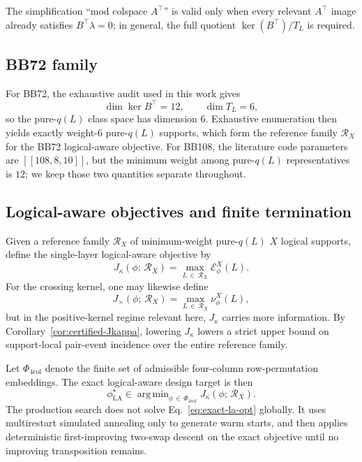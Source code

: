 \documentclass[
aps,
prx,
10pt,
twocolumn,
groupedaddress,
longbibliography,
nofootinbib,
floatfix
]{revtex4-2}
\theoremstyle{definition}
\DeclareMathOperator{\kerop}{ker}
\DeclareMathOperator*{\argmin}{arg\,min}
\newcommand{\Ew}{\mathcal{E}}
\newcommand{\RX}{\mathcal{R}_X}
\newcommand{\TL}{T_L}
\newcommand{\bb}[1]{\ensuremath{\left[\!\left[#1\right]\!\right]}}
\begin{document}
The simplification ``mod colspace $A^\top$'' is valid only when every relevant $A^\top$ image already satisfies $B^\top\lambda=0$; in general, the full quotient $\kerop(B^\top)/\TL$ is required.

\subsection{BB72 family}

For BB72, the exhaustive audit used in this work gives
\begin{equation}
\dim \kerop B^\top=12,
\qquad
\dim \TL=6,
\end{equation}
so the pure-$q(L)$ class space has dimension $6$. Exhaustive enumeration then yields exactly \bbSeventyTwoPureLFamilyCount{} weight-$6$ pure-$q(L)$ supports, which form the reference family $\RX$ for the BB72 logical-aware objective. For BB108, the literature code parameters are \bb{108,8,10}, but the minimum weight among pure-$q(L)$ representatives is $12$; we keep those two quantities separate throughout.

\subsection{Logical-aware objectives and finite termination}

Given a reference family $\RX$ of minimum-weight pure-$q(L)$ $X$ logical supports, define the single-layer logical-aware objective by
\begin{equation}
J_{\kappa}(\phi;\,\RX)=\max_{L\,\in\,\RX}\Ew_{\phi}^{X}(L).
\label{eq:Jkappa}
\end{equation}
For the crossing kernel, one may likewise define
\begin{equation}
J_{\times}(\phi;\,\RX)=\max_{L\,\in\,\RX}\nu_{\phi}^{X}(L),
\end{equation}
but in the positive-kernel regime relevant here, $J_{\kappa}$ carries more information. By Corollary~\ref{cor:certified-Jkappa}, lowering $J_{\kappa}$ lowers a strict upper bound on support-local pair-event incidence over the entire reference family.

Let $\Phi_{\mathrm{4col}}$ denote the finite set of admissible four-column row-permutation embeddings. The exact logical-aware design target is then
\begin{equation}
\phi_{\mathrm{LA}}^{\star}\in \argmin_{\phi\,\in\,\Phi_{\mathrm{4col}}} J_{\kappa}(\phi;\,\RX).
\label{eq:exact-la-opt}
\end{equation}
The production search does not solve Eq.~\eqref{eq:exact-la-opt} globally. It uses multirestart simulated annealing only to generate warm starts, and then applies deterministic first-improving two-swap descent on the exact objective until no improving transposition remains.
\end{document}
